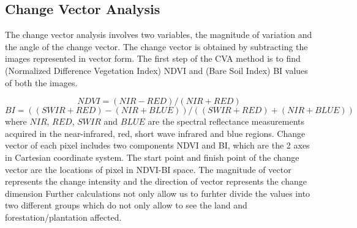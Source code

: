 \documentclass[12pt,a4paper,IEEEtran]{article}
\begin{document}



\subsection[3.3]{Change Vector Analysis}
The change vector analysis \cite{MINU20151366} involves two variables, the magnitude of variation and the angle of the change vector.
The change vector is obtained by subtracting the images represented in vector form.
The first step of the CVA method is to find (Normalized Difference Vegetation Index) NDVI and (Bare Soil Index) BI values of both the images.

\begin{equation} NDVI = (NIR - RED) / (NIR + RED) \end{equation}
\begin{equation}
	BI = ((SWIR + RED) - (NIR + BLUE)) / ((SWIR + RED) + (NIR + BLUE))
\end{equation} 
where $NIR$, $RED$, $SWIR$ and $BLUE$ are the spectral reflectance measurements acquired in the near-infrared, red, short wave infrared and blue regions.
Change vector of each pixel includes two components NDVI and BI, which are the 2 axes in Cartesian coordinate system. The start point and finish point of the change vector are the locations of pixel in NDVI-BI space. The magnitude of vector represents the change intensity and the direction of vector represents the change dimension 
Further calculations not only allow us to furhter divide the values into two different groups which do not only allow to see the land and forestation/plantation affected.

\end{document}
